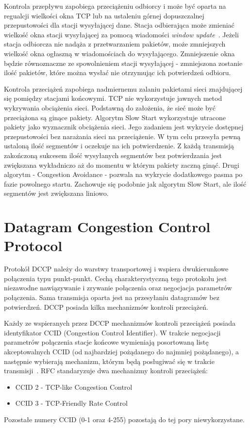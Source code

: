 Kontrola przepływu zapobiega przeciążeniu odbiorcy i może być oparta na regualcji wielkości okna TCP lub na ustaleniu górnej dopuszczalnej przepustowości dla stacji wysyłającej dane.  Stacja odbierająca może zmieniać wielkość okna stacji wysyłającej za pomocą wiadomości \textit{window update}~\cite{Stevens}. Jeżeli stacja odbiorcza nie nadąża z przetwarzaniem pakietów, może zmniejszych wielkość okna ogłaszną w wiadomościach do wysyłającego. Zmniejszenie okna będzie równoznaczne ze spowolnieniem stacji wysyłającej - zmniejszona zostanie ilość pakietów, które można wysłać nie otrzymując ich potwierdzeń odbioru.

Kontrola przeciążeń zapobiega nadmiernemu zalaniu pakietami sieci znajdującej się pomiędzy stacjami końcowymi. TCP nie wykorzystuje  jawnych metod wykrywania obciążenia sieci. Podstawną do założenia, że sieć może być przeciążona są ginące pakiety. Algorytm Slow Start wykorzystuje utracone pakiety jako wyznacznik obciążenia sieci. 
Jego zadaniem jest wykrycie dostępnej przepustowości bez narażania sieci na przeciążenie. W tym celu przesyła pewną ustaloną ilość segmentów i oczekuje na ich potwierdzenie. Z każdą transmisją zakończoną sukcesem ilość wysyłanych segmentów bez potwierdzania jest zwiększana wykładniczo aż do momentu w którym pakiety zaczną ginąć. Drugi algorytm - Congestion Avoidance - pozwala na wykrycie dodatkowego pasma po fazie powolnego startu. Zachowuje się podobnie jak algorytm Slow Start, ale ilość segmentów jest zwiększana liniowo.~\cite{RFC793}

\section{Datagram Congestion Control Protocol}
\label{sec:DCCP}

Protokół DCCP należy do warstwy transportowej i wspiera dwukierunkowe połączenia typu punkt-punkt. Cechą charakterystyczną tego protokołu jest niezawodne nawiązywanie i zrywanie połączenia oraz negocjacja parametrów połączenia. Sama transmisja oparta jest na przesyłaniu datagramów bez potwierdzeń. DCCP posiada kilka mechanizmów kontroli przeciążeń.

Każdy ze wspieranych przez DCCP mechanizmów kontroli przeciążeń posiada identyfikator CCID (Congestion Control Identifier). W trakcie negocjacji parametrów połączenia stacje końcowe wymieniają posortowaną listę akceptowalnych CCID (od najbardziej pożądanego do najmniej pożądanego), a następnie wybierają mechanizm, którym będą posługiwać się w trakcie transmisji~\cite{RFC5762}. RFC standaryzuje dwa mechanizmy kontroli przeciążeń:
\begin{itemize}
  \item CCID 2 - TCP-like Congestion Control
  \item CCID 3 - TCP-Friendly Rate Control
\end{itemize}
Pozostałe numery CCID (0-1 oraz 4-255) pozostają do tej pory niewykorzystane.

